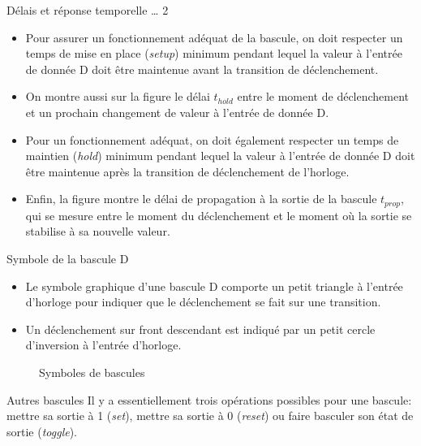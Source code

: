 \documentclass[presentation]{beamer}
\begin{document}
\begin{frame}[label={sec:org940dbb6}]{Délais et réponse temporelle \ldots{} 2}
\begin{itemize}
\item Pour assurer un fonctionnement adéquat de la bascule, on doit respecter un temps de \alert{mise en place} (\emph{setup}) minimum pendant lequel la valeur à l'entrée de donnée D doit être maintenue \alert{avant} la transition de déclenchement.

\item On montre aussi sur la figure le délai \(t_{hold}\) entre le moment de déclenchement et un prochain changement de valeur à l'entrée de donnée D.

\item Pour un fonctionnement adéquat, on doit également respecter un temps de \alert{maintien} (\emph{hold}) minimum pendant lequel la valeur à l'entrée de donnée D doit être maintenue \alert{après} la transition de déclenchement de l'horloge.

\item Enfin, la figure montre le délai de propagation à la sortie de la bascule \(t_{prop}\), qui se mesure entre le moment du déclenchement et le moment où la sortie se stabilise à sa nouvelle valeur.
\end{itemize}
\end{frame}

\begin{frame}[label={sec:orgc543bdd}]{Symbole de la bascule D}
\begin{itemize}
\item Le symbole graphique d'une bascule D comporte un petit triangle à l'entrée d'horloge pour indiquer que le déclenchement se fait sur une transition.

\item Un déclenchement sur front descendant est indiqué par un petit cercle d'inversion à l'entrée d'horloge.
\end{itemize}

\begin{figure}[htbp]
\centering

\caption{\label{fig:org68c0387}Symboles de bascules}
\end{figure}
\end{frame}

\begin{frame}[label={sec:org6f40b93}]{Autres bascules}
Il y a essentiellement trois opérations possibles pour une bascule:
mettre sa sortie à 1 (\emph{set}), mettre sa sortie à 0 (\emph{reset}) ou faire
basculer son état de sortie (\emph{toggle}).
\end{frame}
\end{document}
